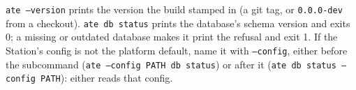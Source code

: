 \texttt{ate --version} prints the version the build stamped in (a git tag, or \texttt{0.0.0-dev}
from a checkout). \texttt{ate db status} prints the database's schema version and exits 0; a
missing or outdated database makes it print the refusal and exit 1. If the Station's config is not
the platform default, name it with \texttt{--config}, either before the subcommand
(\texttt{ate --config PATH db status}) or after it (\texttt{ate db status --config PATH}): either
reads that config.

